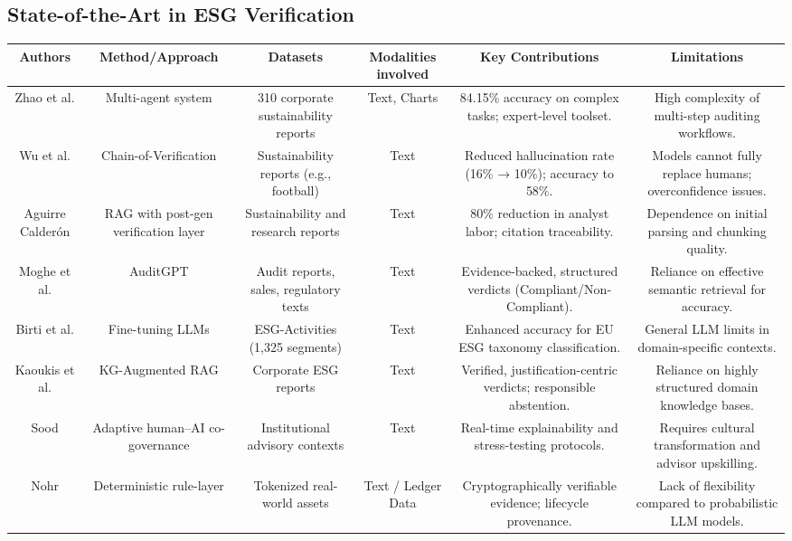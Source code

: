 \documentclass{article}
\begin{document}
\subsection{State-of-the-Art in ESG Verification}
\begin{table}[h!]
\centering
\begin{tabular}{|c|c|c|c|c|c|}
\hline
Authors & Method/Approach & Datasets & Modalities involved & Key Contributions & Limitations \\ \hline
Zhao et al.  \parencite{yilei_zhao_b7bbd9c8} & Multi-agent system & 310 corporate sustainability reports & Text, Charts & 84.15\% accuracy on complex tasks; expert-level toolset. & High complexity of multi-step auditing workflows. \\ \hline
Wu et al.  \parencite{yue_wu_cae353aa} & Chain-of-Verification & Sustainability reports (e.g., football) & Text & Reduced hallucination rate (16\% → 10\%); accuracy to 58\%. & Models cannot fully replace humans; overconfidence issues. \\ \hline
Aguirre Calderón  \parencite{juan_aguirre_calder_n_5eae82e0} & RAG with post-gen verification layer & Sustainability and research reports & Text & 80\% reduction in analyst labor; citation traceability. & Dependence on initial parsing and chunking quality. \\ \hline
Moghe et al.  \parencite{abhijeet_b__moghe_963e6c96} & AuditGPT & Audit reports, sales, regulatory texts & Text & Evidence-backed, structured verdicts (Compliant/Non-Compliant). & Reliance on effective semantic retrieval for accuracy. \\ \hline
Birti et al.  \parencite{mattia_birti_c097e3e8} & Fine-tuning LLMs & ESG-Activities (1,325 segments) & Text & Enhanced accuracy for EU ESG taxonomy classification. & General LLM limits in domain-specific contexts. \\ \hline
Kaoukis et al.  \parencite{kaoukis__georgios_35bab107} & KG-Augmented RAG & Corporate ESG reports & Text & Verified, justification-centric verdicts; responsible abstention. & Reliance on highly structured domain knowledge bases. \\ \hline
Sood  \parencite{rohit_sood_cb3a4ead} & Adaptive human–AI co-governance & Institutional advisory contexts & Text & Real-time explainability and stress-testing protocols. & Requires cultural transformation and advisor upskilling. \\ \hline
Nohr  \parencite{steven_paul_nohr_a6874924} & Deterministic rule-layer & Tokenized real-world assets & Text / Ledger Data & Cryptographically verifiable evidence; lifecycle provenance. & Lack of flexibility compared to probabilistic LLM models. \\ \hline

\end{tabular}
\end{table}
\end{document}
